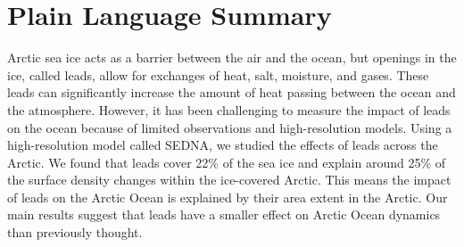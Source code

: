 \documentclass[draft]{agujournal2019}
\begin{document}
%
%

%
%


\begin{abstract}
      The Arctic sea ice, in particular the ice pack, acts as an insulator between the atmosphere and the ocean. Leads, commonly found in the Arctic, facilitate ocean-atmosphere flux exchanges. Local observations have captured heat fluxes through some leads one order of magnitude larger than those outside of the leads, leading to the speculation that air-sea exchanges through leads contribute significantly to the Arctic Ocean surface buoyancy forcing.
      Here, we quantify the magnitude and impact on the ocean surface of the leads using SEDNA, a subkilometer pan-Arctic hindcast. Leads account for 22\% of the sea ice cover surface, and within them, there is approximately 25\% of the total surface water mass transformation. In other words, the water mass transformation in leads is similar to those underneath the surrounding ice-covered oceans. Thus, the present estimate indicates that leads have a small contribution to Arctic Ocean dynamics, contrary to previous hypotheses.
\end{abstract}

\section*{Plain Language Summary}
Arctic sea ice acts as a barrier between the air and the ocean, but openings in the ice, called leads, allow for exchanges of heat, salt, moisture, and gases. These leads can significantly increase the amount of heat passing between the ocean and the atmosphere. However, it has been challenging to measure the impact of leads on the ocean because of limited observations and high-resolution models. Using a high-resolution model called SEDNA, we studied the effects of leads across the Arctic. We found that leads cover 22\% of the sea ice and explain around 25\% of the surface density changes within the ice-covered Arctic. This means the impact of leads on the Arctic Ocean is explained by their area extent in the Arctic. Our main results suggest that leads have a smaller effect on Arctic Ocean dynamics than previously thought.
\end{document}
